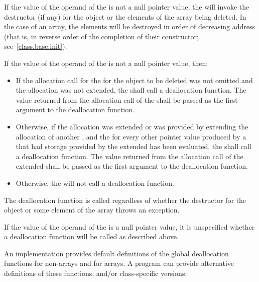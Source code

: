 \pnum
{}%
If the value of the operand of the  is not a
null pointer value, the  will invoke the
destructor (if any) for the object or the elements of the array being
deleted. In the case of an array, the elements will be destroyed in
order of decreasing address (that is, in reverse order of the completion
of their constructor; see~\ref{class.base.init}).

\pnum
If the value of the operand of the  is not a
null pointer value, then:

\begin{itemize}
\item
If the allocation call for the  for the object to
be deleted was not omitted and the allocation was not extended, the
 shall call a deallocation
function. The value returned from the
allocation call of the  shall be passed as the
first argument to the deallocation function.

\item
Otherwise, if the allocation was extended or was provided by extending the
allocation of another , and the
 for every other pointer value produced by a
 that had storage provided by the extended
 has been evaluated, the
 shall call a deallocation function. The value
returned from the allocation call of the extended 
shall be passed as the first argument to the deallocation function.

\item
Otherwise, the  will not call a
deallocation function.
\end{itemize}
\begin{note}
The deallocation function is called regardless of whether the destructor
for the object or some element of the array throws an exception.
\end{note}
If the value of the operand of the  is a
null pointer value, it is unspecified whether a deallocation function will be
called as described above.

\pnum
\begin{note}
An implementation provides default definitions of the global
deallocation functions  for
non-arrays and
%
 for arrays. A \Cpp{}
program can provide alternative definitions of these
functions, and/or class-specific
versions.
\end{note}

